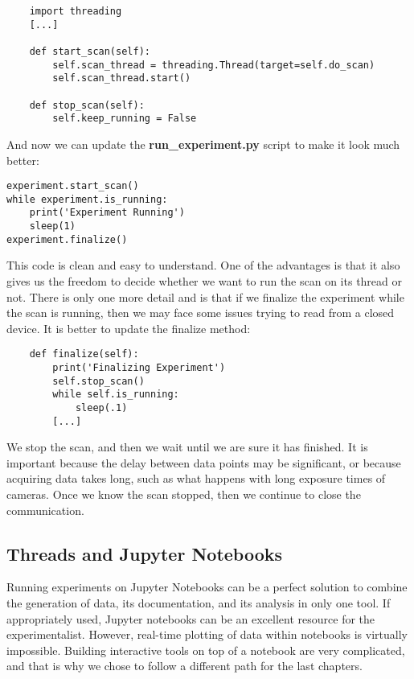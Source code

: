 \begin{verbatim}
    import threading
    [...]

    def start_scan(self):
        self.scan_thread = threading.Thread(target=self.do_scan)
        self.scan_thread.start()

    def stop_scan(self):
        self.keep_running = False
\end{verbatim}

And now we can update the \textbf{run\_experiment.py} script to make it look much better:

\begin{verbatim}
experiment.start_scan()
while experiment.is_running:
    print('Experiment Running')
    sleep(1)
experiment.finalize()
\end{verbatim}

This code is clean and easy to understand. One of the advantages is that it also gives us the freedom to decide whether we want to run the scan on its thread or not. There is only one more detail and is that if we finalize the experiment while the scan is running, then we may face some issues trying to read from a closed device. It is better to update the finalize method:

\begin{verbatim}
    def finalize(self):
        print('Finalizing Experiment')
        self.stop_scan()
        while self.is_running:
            sleep(.1)
        [...]
\end{verbatim}

We stop the scan, and then we wait until we are sure it has finished. It is important because the delay between data points may be significant, or because acquiring data takes long, such as what happens with long exposure times of cameras. Once we know the scan stopped, then we continue to close the communication.

\subsection{Threads and Jupyter Notebooks}\label{subsec:jupyter}
Running experiments on Jupyter Notebooks can be a perfect solution to combine the generation of data, its documentation, and its analysis in only one tool. If appropriately used, Jupyter notebooks can be an excellent resource for the experimentalist. However, real-time plotting of data within notebooks is virtually impossible. Building interactive tools on top of a notebook are very complicated, and that is why we chose to follow a different path for the last chapters.

